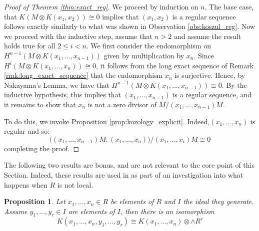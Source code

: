 \documentclass[12pt]{article}
\theoremstyle{plain}
\newtheorem{proposition}[thm]{Proposition}
\theoremstyle{definition}
\begin{document}
\begin{proof}[Proof of Theorem \ref{thm:exact_reg}]
We proceed by induction on $n$. The base case, that $K(M \otimes K(x_1,x_2)) \cong 0$ implies that $(x_1,x_2)$ is a regular sequence follows exactly similarly to what was shown in Observation \ref{obs:koszul_reg}. Now we proceed with the inductive step, assume that $n >2$ and assume the result holds true for all $2 \leq i < n$. We first consider the endomorphism on $H^{n-1}(M \otimes K(x_1,...,x_{n-1}))$ given by multiplication by $x_n$. Since $H^i(M \otimes K(x_1,...,x_n)) \cong 0$, it follows from the long exact sequence of Remark \ref{rmk:long_exact_sequence} that the endomorphism $x_n$ is surjective. Hence, by Nakayama's Lemma, we have that $H^{n-1}(M \otimes K(x_1,...,x_{n-1})) \cong 0$. By the inductive hypothesis, this implies that $(x_1,...,x_{n-1})$ is a regular sequence, and it remains to show that $x_n$ is not a zero divisor of $M/(x_1,...,x_{n-1})M$.

To do this, we invoke Proposition \ref{prop:kozology_explicit}. Indeed,$(x_1,...,x_n)$ is regular and so:
\begin{equation}
    \big((x_1,...,x_{n-1})M:(x_1,...,x_n)\big)/(x_1,...,x_i)M \cong 0
\end{equation}
completing the proof.
\end{proof}
The following two results are bonus, and are not relevant to the core point of this Section. Indeed, these results are used in \cite[\S17.3]{view} as part of an investigation into what happens when $R$ is not local.
\begin{proposition}\label{prop:in_gen_ideal}
Let $x_1,...,x_n \in R$ be elements of $R$ and $I$ the ideal they generate. Assume $y_1,...,y_r \in I$ are elements of $I$, then there is an isomorphism
\begin{equation}
K(x_1,...,x_n,y_1,...,y_r) \cong K(x_1,...,x_n) \otimes \wedge R^r
\end{equation}
\end{proposition}
\end{document}

